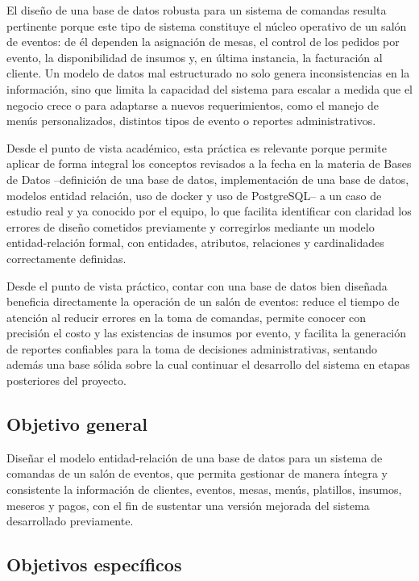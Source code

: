 El diseño de una base de datos robusta para un sistema de comandas resulta pertinente porque este tipo de sistema constituye el núcleo operativo de un salón de eventos: de él dependen la asignación de mesas, el control de los pedidos por evento, la disponibilidad de insumos y, en última instancia, la facturación al cliente. Un modelo de datos mal estructurado no solo genera inconsistencias en la información, sino que limita la capacidad del sistema para escalar a medida que el negocio crece o para adaptarse a nuevos requerimientos, como el manejo de menús personalizados, distintos tipos de evento o reportes administrativos.

Desde el punto de vista académico, esta práctica es relevante porque permite aplicar de forma integral los conceptos revisados a la fecha en la materia de Bases de Datos --definición de una base de datos, implementación de una base de datos, modelos entidad relación, uso de docker y uso de PostgreSQL-- a un caso de estudio real y ya conocido por el equipo, lo que facilita identificar con claridad los errores de diseño cometidos previamente y corregirlos mediante un modelo entidad-relación formal, con entidades, atributos, relaciones y cardinalidades correctamente definidas.

Desde el punto de vista práctico, contar con una base de datos bien diseñada beneficia directamente la operación de un salón de eventos: reduce el tiempo de atención al reducir errores en la toma de comandas, permite conocer con precisión el costo y las existencias de insumos por evento, y facilita la generación de reportes confiables para la toma de decisiones administrativas, sentando además una base sólida sobre la cual continuar el desarrollo del sistema en etapas posteriores del proyecto.

\subsection{Objetivo general}

Diseñar el modelo entidad-relación de una base de datos para un sistema de comandas de un salón de eventos, que permita gestionar de manera íntegra y consistente la información de clientes, eventos, mesas, menús, platillos, insumos, meseros y pagos, con el fin de sustentar una versión mejorada del sistema desarrollado previamente.

\subsection{Objetivos específicos}


